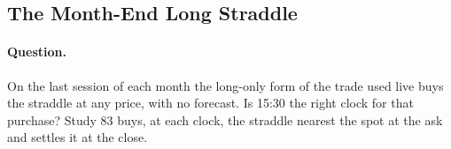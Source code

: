 \subsection{The Month-End Long Straddle}
\label{sec:app_run_monthend}

\paragraph{Question.} On the last session of each month the long-only form of
the trade used live buys the straddle at any price, with no forecast. Is 15:30
the right clock for that purchase? Study 83 buys, at each clock, the straddle
nearest the spot at the ask and settles it at the close.

\begin{table}[H]
\centering
\caption{The month-end long straddle by entry clock, \runappMeN{} month-ends
from \runappMeFirst{} to \runappMeLast{}, bought at the ask. The spread is the
median relative spread at entry; minus 15:30 is the paired difference in mean
$R$, with its paired $t$ and the Holm-adjusted $p$ over the twelve earlier
clocks.}
\label{tab:app_run_monthend}
\runappfit{\small}
\end{table}


